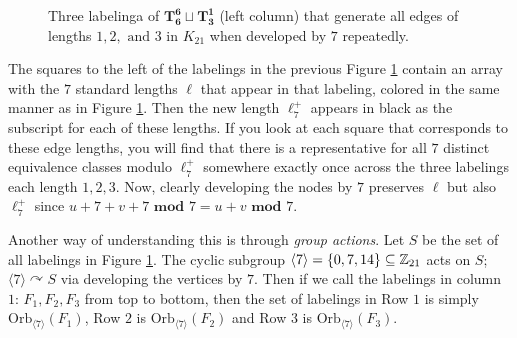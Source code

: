 \begin{figure}[H]
\begin{center}
    \end{center}
    \caption{Three labelinga of $\mathbf{T_{6}^{6}}\sqcup \mathbf{T_{3}^{1}}$ (left column) that generate all edges of lengths $1,2,\text{ and }3$ in $K_{21}$ when developed by $7$ repeatedly.}
    \label{fig:K21labelingex}
  \end{figure}

  The squares to the left of the labelings in the previous Figure \ref{fig:K21labelingex} contain an array with the $7$ standard lengths $\ell$ that appear in that labeling, colored in the same manner as in Figure \ref{fig:K21labelingex}.  Then the new length $\ell_{7}^{+}$ appears in black as the subscript for each of these lengths. If you look at each square that corresponds to these edge lengths, you will find that there is a representative for all $7$ distinct equivalence classes modulo $\ell_{7}^{+}$ somewhere exactly once across the three labelings each length $1,2,3$. Now, clearly developing the nodes by $7$ preserves $\ell$ but also $\ell_{7}^{+}$ since $u+7+v+7\textbf{ mod }7=u+v\textbf{ mod }7$.
  
  Another way of understanding this is through \textit{group actions}. Let $S$ be the set of all labelings in Figure \ref{fig:K21labelingex}. The cyclic subgroup $\langle 7\rangle=\{0,7,14\}\subseteq \mathbb{Z}_{21}$ acts on $S$; $\langle 7\rangle\curvearrowright S$ via developing the vertices by $7$. Then if we call the labelings in column $1$: $F_{1},F_{2},F_{3}$ from top to bottom, then the set of labelings in Row $1$ is simply $\mathrm{Orb}_{\langle 7\rangle}(F_{1})$, Row $2$ is $\mathrm{Orb}_{\langle 7\rangle}(F_{2})$ and Row $3$ is $\mathrm{Orb}_{\langle 7 \rangle}(F_{3})$.

